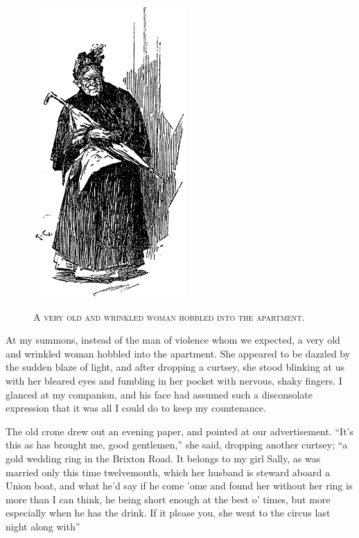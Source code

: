 \documentclass[12pt,english]{book}
\newcommand{\noun}[1]{\textsc{#1}}
\begin{document}
%
\begin{figure}[htbp]
\noindent \begin{center}\includegraphics{images/study10-stud-09.png}\end{center}

\noindent \begin{center}\noun{A very old and wrinkled woman hobbled
into the apartment.}\end{center}
\end{figure}
At my summons, instead of the man of violence whom we expected, a
very old and wrinkled woman hobbled into the apartment. She appeared
to be dazzled by the sudden blaze of light, and after dropping a curtsey,
she stood blinking at us with her bleared eyes and fumbling in her
pocket with nervous, shaky fingers. I glanced at my companion, and
his face had assumed such a disconsolate expression that it was all
I could do to keep my countenance.

The old crone drew out an evening paper, and pointed at our advertisement.
{}``It's this as has brought me, good gentlemen,'' she said, dropping
another curtsey; {}``a gold wedding ring in the Brixton Road. It
belongs to my girl Sally, as was married only this time twelvemonth,
which her husband is steward aboard a Union boat, and what he'd say
if he come 'ome and found her without her ring is more than I can
think, he being short enough at the best o' times, but more especially
when he has the drink. If it please you, she went to the circus last
night along with\mdsh{---}''
\end{document}
